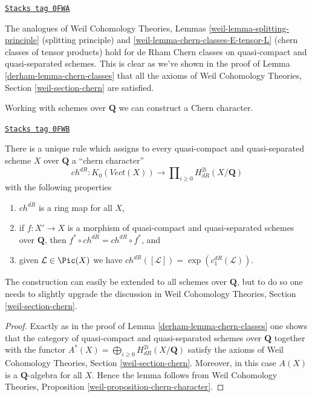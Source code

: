 \begin{remark}
\label{derham-remark-splitting-principle}
\href{https://stacks.math.columbia.edu/tag/0FWA}{\texttt{Stacks tag 0FWA}}

The analogues of Weil Cohomology Theories, Lemmas
\ref{weil-lemma-splitting-principle} (splitting principle) and
\ref{weil-lemma-chern-classes-E-tensor-L} (chern classes of tensor products)
hold for de Rham Chern classes on quasi-compact and quasi-separated schemes.
This is clear as we've shown in the proof of
Lemma \ref{derham-lemma-chern-classes}
that all the axioms of Weil Cohomology Theories, Section
\ref{weil-section-chern} are satisfied.
\end{remark}

Working with schemes over $\mathbf{Q}$ we can construct a Chern character.

\begin{lemma}
\label{derham-lemma-chern-character}
\href{https://stacks.math.columbia.edu/tag/0FWB}{\texttt{Stacks tag 0FWB}}

There is a unique rule which assigns to every quasi-compact and quasi-separated
scheme $X$ over $\mathbf{Q}$ a ``chern character''
$$
ch^{dR} : K_0(\textit{Vect}(X)) \longrightarrow
\prod\nolimits_{i \geq 0} H_{dR}^{2i}(X/\mathbf{Q})
$$
with the following properties
\begin{enumerate}
\item $ch^{dR}$ is a ring map for all $X$,
\item if $f : X' \to X$ is a morphism of quasi-compact and quasi-separated
schemes over $\mathbf{Q}$, then $f^* \circ ch^{dR} =  ch^{dR} \circ f^*$, and
\item given $\mathcal{L} \in \Pic(X)$
we have $ch^{dR}([\mathcal{L}]) = \exp(c_1^{dR}(\mathcal{L}))$.
\end{enumerate}
\end{lemma}

The construction can easily be extended to all schemes over $\mathbf{Q}$,
but to do so one needs to slightly upgrade the discussion in
Weil Cohomology Theories, Section \ref{weil-section-chern}.

\begin{proof}

Exactly as in the proof of Lemma \ref{derham-lemma-chern-classes}
one shows that the category of quasi-compact and quasi-separated
schemes over $\mathbf{Q}$ together with the functor
$A^*(X) = \bigoplus_{i \geq 0} H_{dR}^{2i}(X/\mathbf{Q})$
satisfy the axioms of
Weil Cohomology Theories, Section \ref{weil-section-chern}.
Moreover, in this case $A(X)$ is a $\mathbf{Q}$-algebra for
all $X$. Hence the lemma follows from
Weil Cohomology Theories, Proposition
\ref{weil-proposition-chern-character}.
\end{proof}

